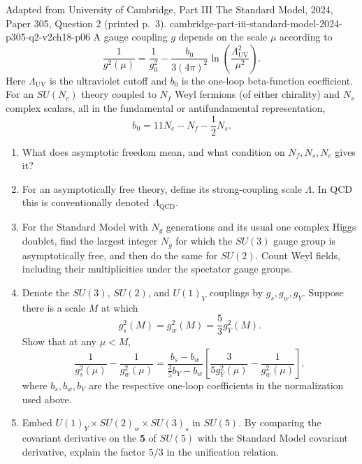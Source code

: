 \begin{enumerate}
  {Adapted from University of Cambridge, Part III The Standard Model,
  2024, Paper 305, Question 2 (printed p.~3).}
  {cambridge-part-iii-standard-model-2024-p305-q2-v2ch18-p06}
  A gauge coupling \(g\) depends on the scale \(\mu\) according to
  \[
    \frac{1}{g^2(\mu)}=\frac{1}{g_0^2}
      -\frac{b_0}{3(4\pi)^2}
       \ln\left(\frac{\Lambda_{\mathrm{UV}}^2}{\mu^2}\right).
  \]
  Here \(\Lambda_{\mathrm{UV}}\) is the ultraviolet cutoff and \(b_0\)
  is the one-loop beta-function coefficient.  For an \(SU(N_c)\) theory
  coupled to \(N_f\) Weyl fermions (of either chirality) and \(N_s\)
  complex scalars, all in the fundamental or antifundamental
  representation,
  \[
    b_0=11N_c-N_f-\frac12N_s.
  \]
  \begin{enumerate}
    \item[(i)] What does asymptotic freedom mean, and what condition on
    \(N_f,N_s,N_c\) gives it?
    \item[(ii)] For an asymptotically free theory, define its strong-coupling
    scale \(\Lambda\).  In QCD this is conventionally denoted
    \(\Lambda_{\mathrm{QCD}}\).
    \item[(iii)] For the Standard Model with \(N_g\) generations and its
    usual one complex Higgs doublet, find the largest integer \(N_g\) for
    which the \(SU(3)\) gauge group is asymptotically free, and then do the
    same for \(SU(2)\).  Count Weyl fields, including their multiplicities
    under the spectator gauge groups.
    \item[(iv)] Denote the \(SU(3)\), \(SU(2)\), and \(U(1)_Y\) couplings
    by \(g_s,g_w,g_Y\).  Suppose there is a scale \(M\) at which
    \[
      g_s^2(M)=g_w^2(M)=\frac53g_Y^2(M).
    \]
    Show that at any \(\mu<M\),
    \[
      \frac{1}{g_s^2(\mu)}-\frac{1}{g_w^2(\mu)}
      =\frac{b_s-b_w}{\tfrac35b_Y-b_w}\left[
        \frac{3}{5g_Y^2(\mu)}-\frac{1}{g_w^2(\mu)}
      \right],
    \]
    where \(b_s,b_w,b_Y\) are the respective one-loop coefficients in the
    normalization used above.
    \item[(v)] Embed
    \(U(1)_Y\times SU(2)_w\times SU(3)_s\) in \(SU(5)\).  By comparing the
    covariant derivative on the \(\mathbf5\) of \(SU(5)\) with the
    Standard Model covariant derivative, explain the factor \(5/3\) in the
    unification relation.
  \end{enumerate}


\end{enumerate}
